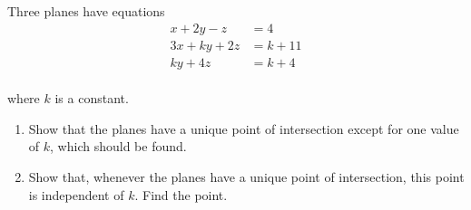 \documentclass[leqno]{article}
\begin{document}
\begin{enumerate}[
  label=\textbf{\arabic*.},
  leftmargin=*,
  topsep=0pt,
  partopsep=0pt,
  parsep=0pt
]
\newpage

\questionitem

Three planes have equations
\[
\begin{aligned}
x+2y-z&=4\\
3x+ky+2z&=k+11\\
ky+4z&=k+4
\end{aligned}
\] \\
where $k$ is a constant. \\

\begin{enumerate}[label=\textbf{(\alph*)}]
  \item Show that the planes have a unique point of intersection except for one value of $k$, which should be found.  \\
  \item Show that, whenever the planes have a unique point of intersection, this point is independent of $k$. Find the point.  \\
\end{enumerate}
\end{enumerate}
\end{document}
